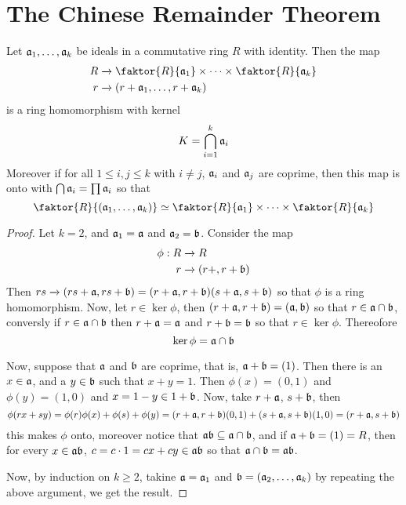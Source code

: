 \section{The Chinese Remainder Theorem}

\begin{theorem}\label{theorem_5.7.1}
  Let $\af_1, \dots, \af_k$ be ideals in a commutative ring $R$ with identity.
  Then the map
  \begin{align*}
    R   &   \xrightarrow{} \faktor{R}{\af_1} \times \dots \times
    \faktor{R}{\af_k} \\
    r   &   \xrightarrow{} (r+\af_1, \dots, r+\af_k)    \\
  \end{align*}
  is a ring homomorphism with kernel
  \begin{equation*}
    K=\bigcap_{i=1}^k{\af_i}
  \end{equation*}
  Moreover if for all $1 \leq i,j \leq k$ with  $i \neq j$,  $\af_i$ and  $\af_j$
  are coprime, then this map is onto with  $\bigcap{\af_i}=\prod{\af_i}$ so that
  \begin{equation*}
    \faktor{R}{(\af_1, \dots, \af_k)} \simeq \faktor{R}{\af_1} \times \dots
    \times \faktor{R}{\af_k}
  \end{equation*}
\end{theorem}
\begin{proof}
  Let $k=2$, and  $\af_1=\af$ and $\af_2=\bf$. Consider the map
  \begin{align*}
    \phi:R  &   \xrightarrow{} R  \\
    r   &   \xrightarrow{}  (r+,r+\bf)   \\
  \end{align*}
  Then $rs \xrightarrow{} (rs+\af,rs+\bf)=(r+\af,r+\bf)(s+\af,s+\bf)$ so that $\phi$ is a
  ring homomorphism. Now, let  $r \in \ker{\phi}$, then $(r+\af,r+\bf)=(\af,\bf)$ so
  that $r \in \af \cap \bf$, conversly if  $r \in \af \cap \bf$ then  $r+\af=\af$ and
  $r+\bf=\bf$ so that  $r \in \ker{\phi}$. Thereofore
  \begin{equation*}
    \ker{\phi}=\af \cap \bf
  \end{equation*}

  Now, suppose that $\af$ and  $\bf$ are coprime, that is, $\af+\bf=(1)$. Then there
  is an  $x \in \af$, and a  $y \in \bf$ such that  $x+y=1$. Then $\phi(x)=(0,1)$
  and $\phi(y)=(1,0)$ and $x=1-y \in 1+\bf$. Now, take  $r+\af$,  $s+\bf$, then
  \begin{equation*}
    \phi(rx+sy)=\phi(r)\phi(x)+\phi(s)+\phi(y)=(r+\af,r+\bf)(0,1)+(s+\af,s+\bf)(1,0)
    =(r+\af,s+\bf)
  \end{equation*}
  this makes $\phi$ onto, moreover notice that  $\af\bf \subseteq \af \cap \bf$, and
  if  $\af+\bf=(1)=R$, then for every $x \in \af\bf$,  $c=c \cdot 1=cx+cy \in \af\bf$ so
  that  $\af \cap \bf=\af\bf$.

  Now, by induction on $k \geq 2$, takine  $\af=\af_1$ and
  $\bf=(\af_2, \dots, \af_k)$ by repeating the above argument, we get
  the result.
\end{proof}
